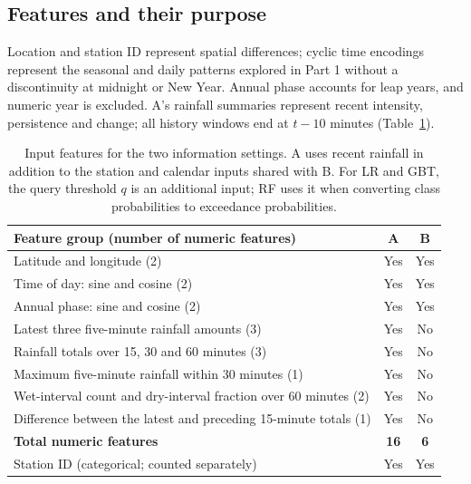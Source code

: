 \FloatBarrier
\subsection{Features and their purpose}
Location and station ID represent spatial differences; cyclic time encodings represent the seasonal and daily patterns explored in Part 1 without a discontinuity at midnight or New Year. Annual phase accounts for leap years, and numeric year is excluded. A's rainfall summaries represent recent intensity, persistence and change; all history windows end at $t-10$ minutes (Table~\ref{tab:input_features}).
\begin{table}[htbp]\centering\small
\begin{tabular}{p{.63\linewidth}cc}\toprule
Feature group (number of numeric features) & A & B\\\midrule
Latitude and longitude (2) & Yes & Yes\\
Time of day: sine and cosine (2) & Yes & Yes\\
Annual phase: sine and cosine (2) & Yes & Yes\\
Latest three five-minute rainfall amounts (3) & Yes & No\\
Rainfall totals over 15, 30 and 60 minutes (3) & Yes & No\\
Maximum five-minute rainfall within 30 minutes (1) & Yes & No\\
Wet-interval count and dry-interval fraction over 60 minutes (2) & Yes & No\\
Difference between the latest and preceding 15-minute totals (1) & Yes & No\\\midrule
\textbf{Total numeric features} & \textbf{16} & \textbf{6}\\
Station ID (categorical; counted separately) & Yes & Yes\\\bottomrule
\end{tabular}
\caption{Input features for the two information settings. A uses recent rainfall in addition to the station and calendar inputs shared with B. For LR and GBT, the query threshold $q$ is an additional input; RF uses it when converting class probabilities to exceedance probabilities.}
\label{tab:input_features}
\end{table}

\FloatBarrier
